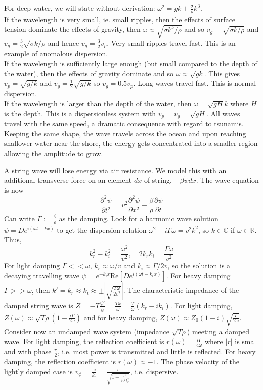 \documentclass[a4paper]{article}
\begin{document}
\begin{eg}
For deep water, we will state without derivation: $\omega^2=gk+\frac{\sigma}{\rho}k^3$.\\[5pt]
If the wavelength is very small, ie. small ripples, then the effects of surface tension dominate the effects of gravity, then $\omega\approx\sqrt{\sigma k^3/\rho}$ and so $v_g=\sqrt{\sigma k/\rho}$ and $v_g=\frac{3}{2}\sqrt{\sigma k/\rho}$ and hence $v_g=\frac{3}{2}v_p$. Very small ripples travel fast. This is an example of anomalous dispersion.\\[5pt]
If the wavelength is sufficiently large enough (but small compared to the depth of the water), then the effects of gravity dominate and so $\omega\approx\sqrt{gk}$. This gives $v_p=\sqrt{g/k}$ and $v_g=\frac{1}{2}\sqrt{g/k}$ so $v_g=0.5v_p$. Long waves travel fast. This is normal dispersion.\\[5pt]
If the wavelength is larger than the depth of the water, then $\omega=\sqrt{gH}k$ where $H$ is the depth. This is a dispersionless system with $v_p=v_g=\sqrt{gH}$. All waves travel with the same speed, a dramatic consequence with regard to tsunamis. Keeping the same shape, the wave travels across the ocean and upon reaching shallower water near the shore, the energy gets concentrated into a smaller region allowing the amplitude to grow.
\end{eg}
\begin{eg}
A string wave will lose energy via air resistance. We model this with an additional transverse force on an element $dx$ of string, $-\beta\dot{\psi}dx$. The wave equation is now
$$\frac{\partial^2\psi}{\partial t^2}=v^2\frac{\partial^2\psi}{\partial x^2}-\frac{\beta}{\rho}\frac{\partial\psi}{\partial t}$$
Can write $\Gamma:=\frac{\beta}{\rho}$ as the damping. Look for a harmonic wave solution $\psi=De^{i(\omega t-kx)}$ to get the dispersion relation $\omega^2-i\Gamma\omega=v^2k^2$, so $k\in\mathbb{C}$ if $\omega\in\mathbb{R}$. Thus,
$$k_r^2-k_i^2=\frac{\omega^2}{v^2},\quad2k_rk_i=\frac{\Gamma\omega}{v^2}$$
For light damping $\Gamma<<\omega$, $k_r\approx\omega/v$ and $k_i\approx\Gamma/2v$, so the solution is a decaying travelling wave  $\psi=e^{-k_ix}\text{Re}[De^{i(\omega t-k_rx)}]$. For heavy damping $\Gamma>>\omega$, then $k'=k_r\approx k_i\approx\pm|\sqrt{\frac{\Gamma\omega}{2v^2}}|$. The characteristic impedance of the damped string wave is $Z=-T\frac{\psi'}{\dot{\psi}}=\frac{Tk}{\omega}=\frac{T}{\omega}(k_r-ik_i)$. For light damping, $Z(\omega)\approx\sqrt{T\rho}(1-\frac{i\Gamma}{2\omega})$ and for heavy damping, $Z(\omega)\approx Z_0(1-i)\sqrt{\frac{\Gamma}{2\omega}}$.\\[5pt]
Consider now an undamped wave system (impedance $\sqrt{T\rho}$) meeting a damped wave. For light damping, the reflection coefficient is $r(\omega)=\frac{i\Gamma}{4\omega}$ where $|r|$ is small and with phase $\frac{\pi}{2}$, i.e. most power is transmitted and little is reflected. For heavy damping, the reflection coefficient is $r(\omega)\approx -1$. The phase velocity of the lightly damped case is $v_\phi=\frac{\omega}{k_r}=\frac{v}{\sqrt{1+\frac{\Gamma^2}{4v^2k_r^2}}}$, i.e. dispersive.
\end{eg}
\newpage
\end{document}

